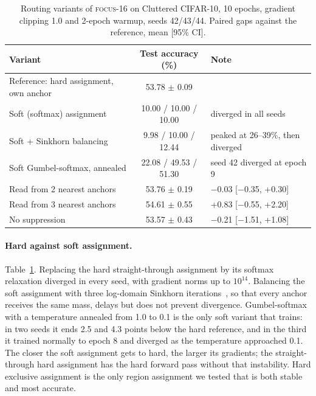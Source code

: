 \documentclass[10pt]{article}
\newcommand{\focus}{\textsc{focus}}
\begin{document}
\begin{table}[t]
\centering
\caption{Routing variants of \focus-16 on Cluttered CIFAR-10, 10 epochs, gradient clipping 1.0
and 2-epoch warmup, seeds 42/43/44. Paired gaps against the reference, mean [95\% CI].}
\label{tab:ablation}
\begin{tabular}{lcl}
\toprule
Variant & Test accuracy (\%) & Note \\
\midrule
Reference: hard assignment, own anchor & 53.78 $\pm$ 0.09 & \\
Soft (softmax) assignment & 10.00 / 10.00 / 10.00 & diverged in all seeds \\
Soft + Sinkhorn balancing & 9.98 / 10.00 / 12.44 & peaked at 26--39\%, then diverged \\
Soft Gumbel-softmax, annealed & 22.08 / 49.53 / 51.30 & seed 42 diverged at epoch 9 \\
Read from 2 nearest anchors & 53.76 $\pm$ 0.19 & $-$0.03 [$-$0.35, +0.30] \\
Read from 3 nearest anchors & 54.61 $\pm$ 0.55 & +0.83 [$-$0.55, +2.20] \\
No suppression & 53.57 $\pm$ 0.43 & $-$0.21 [$-$1.51, +1.08] \\
\bottomrule
\end{tabular}
\end{table}

\paragraph{Hard against soft assignment.} Table~\ref{tab:ablation}. Replacing the hard
straight-through assignment by its softmax relaxation diverged in every seed, with gradient norms
up to $10^{14}$. Balancing the soft assignment with three log-domain Sinkhorn
iterations~\citep{cuturi2013sinkhorn}, so that every anchor receives the same mass, delays but
does not prevent divergence. Gumbel-softmax~\citep{jang2017gumbel} with a temperature annealed
from 1.0 to 0.1 is the only soft variant that trains: in two seeds it ends 2.5 and 4.3 points
below the hard reference, and in the third it trained normally to epoch 8 and diverged as the
temperature approached 0.1. The closer the soft assignment gets to hard, the larger its gradients;
the straight-through hard assignment has the hard forward pass without that instability. Hard
exclusive assignment is the only region assignment we tested that is both stable and most
accurate.
\end{document}
